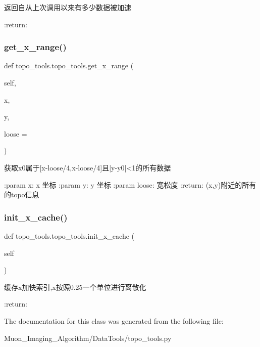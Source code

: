 \begin{DoxyVerb}返回自从上次调用以来有多少数据被加速

:return:
\end{DoxyVerb}
 \mbox{\label{classtopo__tools_1_1topo__tools_a539b10bdbc486db99350fb973840b516}} 
\subsubsection{\texorpdfstring{get\+\_\+x\+\_\+range()}{get\_x\_range()}}
{\footnotesize\ttfamily def topo\+\_\+tools.\+topo\+\_\+tools.\+get\+\_\+x\+\_\+range (\begin{DoxyParamCaption}\item[{}]{self,  }\item[{}]{x,  }\item[{}]{y,  }\item[{}]{loose = {} }\end{DoxyParamCaption})}

\begin{DoxyVerb}获取x0属于[x-loose/4,x-loose/4]且|y-y0|<1的所有数据

:param x: x 坐标
:param y: y 坐标
:param loose: 宽松度
:return: (x,y)附近的所有的topo信息
\end{DoxyVerb}
 \mbox{\label{classtopo__tools_1_1topo__tools_a250235e60a6317a7d24a2a6e62eaad18}} 
\subsubsection{\texorpdfstring{init\+\_\+x\+\_\+cache()}{init\_x\_cache()}}
{\footnotesize\ttfamily def topo\+\_\+tools.\+topo\+\_\+tools.\+init\+\_\+x\+\_\+cache (\begin{DoxyParamCaption}\item[{}]{self }\end{DoxyParamCaption})}

\begin{DoxyVerb}缓存x加快索引,x按照0.25一个单位进行离散化

:return:
\end{DoxyVerb}
 

The documentation for this class was generated from the following file\+:\begin{DoxyCompactItemize}
\item 
Muon\+\_\+\+Imaging\+\_\+\+Algorithm/\+Data\+Tools/topo\+\_\+tools.\+py\end{DoxyCompactItemize}
